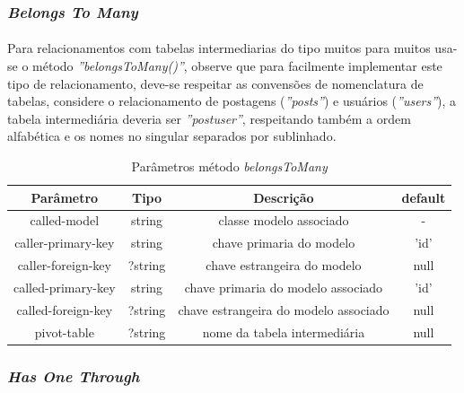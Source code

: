 \spaceH{}

\label{scripts/relation_has_many.php}

\subsubsection{\textit{Belongs To Many}}
\paragraph{}
Para relacionamentos com tabelas intermediarias do tipo muitos para muitos usa-se o método \textit{''belongsToMany()''}, observe que para facilmente implementar este tipo de relacionamento, deve-se respeitar as convensões de nomenclatura de tabelas, considere o relacionamento de postagens (\textit{''posts''}) e usuários (\textit{''users''}), a tabela intermediária deveria ser \textit{''post\textunderscore{ }user''}, respeitando também a ordem alfabética e os nomes no singular separados por sublinhado.

\begin{table}[H]
\centering
\vspace{0.5cm}
\begin{tabular}{|c|c|c|c|}
\hline  
Parâmetro & Tipo & Descrição & default\\
\hline 
called-model       & string  & classe modelo associado               & -    \\
caller-primary-key & string  & chave primaria do modelo              & 'id' \\
caller-foreign-key & ?string & chave estrangeira do modelo           & null \\
called-primary-key & string  & chave primaria do modelo associado    & 'id' \\
called-foreign-key & ?string & chave estrangeira do modelo associado & null \\
pivot-table        & ?string & nome da tabela intermediária          & null \\    
\hline
\end{tabular}
\caption{Parâmetros método \textit{belongsToMany}}
\end{table}

\spaceH{}

\label{scripts/relation_belongs_to_many.php}

\subsubsection{\textit{Has One Through}}

